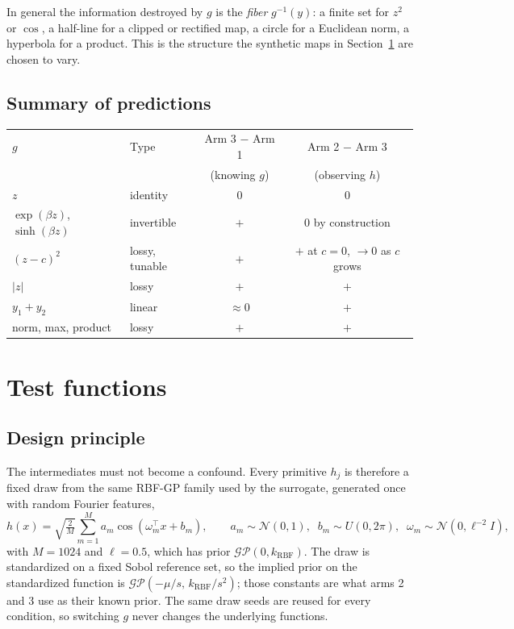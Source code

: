 \documentclass[11pt]{article}
\newcommand{\GP}{\mathcal{GP}}
\newcommand{\Norm}{\mathcal{N}}
\begin{document}
In general the information destroyed by $g$ is the \emph{fiber} $g^{-1}(y)$: a
finite set for $z^2$ or $\cos$, a half-line for a clipped or rectified map, a
circle for a Euclidean norm, a hyperbola for a product. This is the structure
the synthetic maps in Section~\ref{sec:functions} are chosen to vary.

\subsection{Summary of predictions}

\begin{center}
\begin{tabular}{llcc}
\toprule
$g$ & Type & Arm 3 $-$ Arm 1 & Arm 2 $-$ Arm 3 \\
& & (knowing $g$) & (observing $h$) \\
\midrule
$z$                    & identity    & $0$      & $0$ \\
$\exp(\beta z)$, $\sinh(\beta z)$ & invertible & $+$ & $0$ by construction \\
$(z-c)^2$              & lossy, tunable & $+$   & $+$ at $c=0$, $\to 0$ as $c$ grows \\
$|z|$                  & lossy       & $+$      & $+$ \\
$y_1+y_2$              & linear      & $\approx 0$ & $+$ \\
norm, max, product     & lossy       & $+$      & $+$ \\
\bottomrule
\end{tabular}
\end{center}

\section{Test functions}
\label{sec:functions}

\subsection{Design principle}

The intermediates must not become a confound. Every primitive $h_j$ is
therefore a fixed draw from the same RBF-GP family used by the surrogate,
generated once with random Fourier features,
\begin{equation}
h(x)=\sqrt{\tfrac{2}{M}}\sum_{m=1}^{M}a_m\cos(\omega_m^\top x+b_m),
\qquad a_m\sim\Norm(0,1),\;\;b_m\sim U(0,2\pi),\;\;\omega_m\sim\Norm(0,\ell^{-2}I),
\end{equation}
with $M=1024$ and $\ell=0.5$, which has prior $\GP(0,k_{\mathrm{RBF}})$. The draw
is standardized on a fixed Sobol reference set, so the implied prior on the
standardized function is $\GP(-\mu/s,\,k_{\mathrm{RBF}}/s^2)$; those constants are
what arms 2 and 3 use as their known prior. The same draw seeds are reused for
every condition, so switching $g$ never changes the underlying functions.
\end{document}
